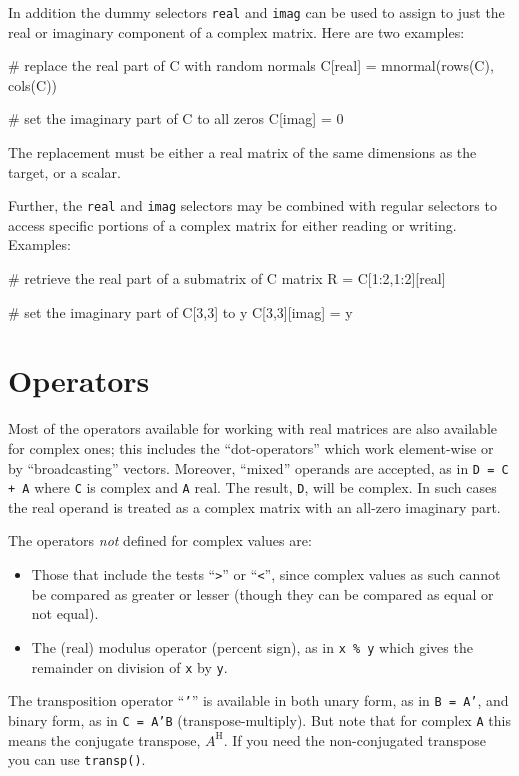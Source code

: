 In addition the dummy selectors \texttt{real} and \texttt{imag} can be
used to assign to just the real or imaginary component of a complex
matrix. Here are two examples:
\begin{code}
# replace the real part of C with random normals
C[real] = mnormal(rows(C), cols(C))

# set the imaginary part of C to all zeros
C[imag] = 0
\end{code}
The replacement must be either a real matrix of the same dimensions as
the target, or a scalar.

Further, the \texttt{real} and \texttt{imag} selectors may be combined
with regular selectors to access specific portions of a complex matrix
for either reading or writing. Examples:
\begin{code}
# retrieve the real part of a submatrix of C
matrix R = C[1:2,1:2][real]

# set the imaginary part of C[3,3] to y
C[3,3][imag] = y
\end{code}

\section{Operators}
\label{sec:cmplx-ops}

Most of the operators available for working with real matrices are
also available for complex ones; this includes the ``dot-operators''
which work element-wise or by ``broadcasting'' vectors. Moreover,
``mixed'' operands are accepted, as in \texttt{D = C + A} where
\texttt{C} is complex and \texttt{A} real. The result, \texttt{D},
will be complex. In such cases the real operand is treated as a
complex matrix with an all-zero imaginary part.

The operators \textit{not} defined for complex values are:
\begin{itemize}
\item Those that include the tests ``\verb+>+'' or ``\verb+<+'', since
  complex values as such cannot be compared as greater or lesser
  (though they can be compared as equal or not equal).
\item The (real) modulus operator (percent sign), as in \texttt{x \%
    y} which gives the remainder on division of \texttt{x} by
  \texttt{y}.
\end{itemize}

The transposition operator ``\texttt{'}'' is available in both unary
form, as in \texttt{B = A'}, and binary form, as in \texttt{C = A'B}
(transpose-multiply). But note that for complex \texttt{A} this means
the conjugate transpose, $A^\mathrm{H}$. If you need the
non-conjugated transpose you can use \texttt{transp()}.

